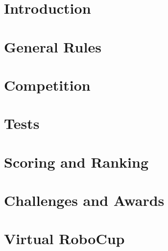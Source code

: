 \documentclass[11pt, twoside, openright, a4paper, chapterprefix]{scrbook}
\begin{document}


\pagestyle{empty}

\tableofcontents
\clearpage

\pagestyle{plain}



\chapter{Introduction}



%


\chapter{General Rules}


\chapter{Competition}


\chapter{Tests}



\chapter{Scoring and Ranking}


% 

\chapter{Challenges and Awards} \label{cha:ChallengesAndAwards}
\label{cha: CAA}


\chapter{Virtual RoboCup}
\label{cha: VRC}

\end{document}
